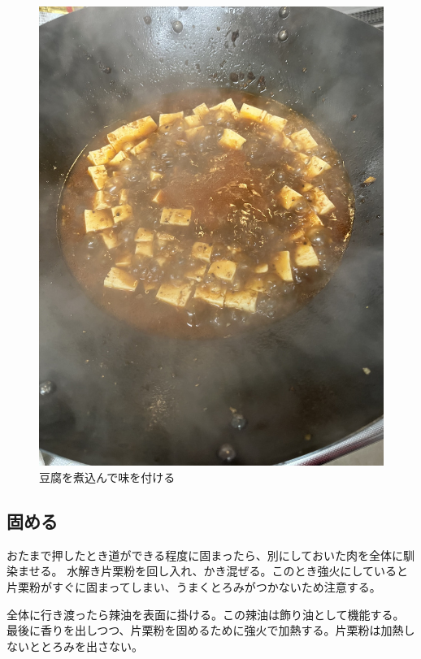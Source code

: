 \documentclass[a4paper,10pt,xelatex,ja=standard,twocolumn]{bxjsarticle}
\begin{document}
\begin{figure}[h]
  \caption{豆腐を煮込んで味を付ける}
  \label{tofu}
  \begin{center}
    \includegraphics[height=\linewidth]{IMG_4086.jpg}
  \end{center}
\end{figure}

\subsection{固める}

おたまで押したとき道ができる程度に固まったら、別にしておいた肉を全体に馴染ませる。
水解き片栗粉を回し入れ、かき混ぜる。このとき強火にしていると片栗粉がすぐに固まってしまい、うまくとろみがつかないため注意する。

全体に行き渡ったら辣油を表面に掛ける。この辣油は飾り油として機能する。
最後に香りを出しつつ、片栗粉を固めるために強火で加熱する。片栗粉は加熱しないととろみを出さない。
\end{document}
